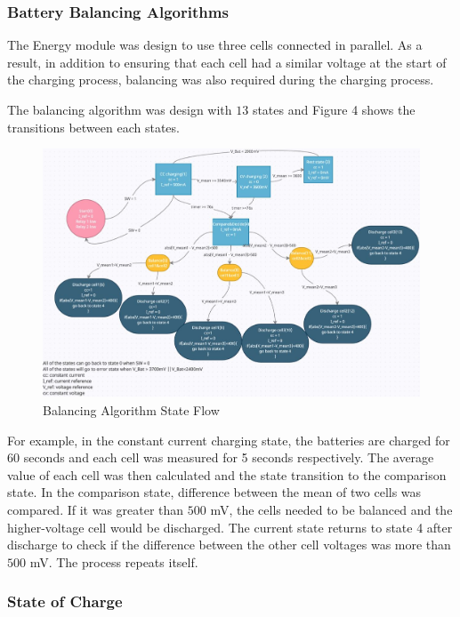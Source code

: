 \documentclass[11pt, a4paper]{article}
\begin{document}
\pagebreak

\subsubsection{Battery Balancing Algorithms}

The Energy module was design to use three cells connected in parallel. As a result, in addition to ensuring that each cell had a similar voltage at the start of the charging process, balancing was also required during the charging process. 

The balancing algorithm was design with $13$ states and Figure 4 shows the transitions between each states.    

\begin{figure} [h!]
    \centering
    \includegraphics[scale=0.65]{Energy_state.JPG}
    \caption{Balancing Algorithm State Flow}
    \label{fig:State}
\end{figure}

For example, in the constant current charging state, the batteries are charged for 60 seconds and each cell was measured for 5 seconds respectively. The average value of each cell was then calculated and the state transition to the comparison state. In the comparison state, difference between the mean of two cells was compared. If it was greater than $500$ mV, the cells needed to be balanced and the higher-voltage cell would be discharged. The current state returns to state 4 after discharge to check if the difference between the other cell voltages was more than $500$ mV. The process repeats itself.

\pagebreak
\subsubsection{State of Charge}
\end{document}
